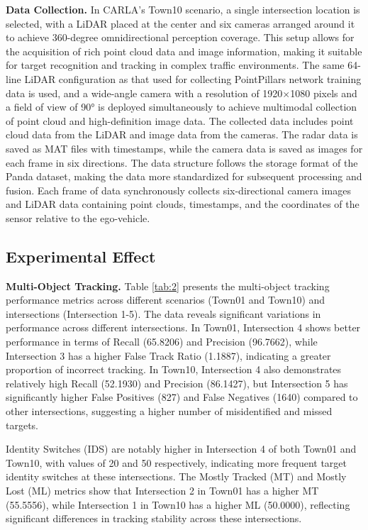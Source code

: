 \documentclass[journal,twoside,web]{ieeecolor}
\begin{document}
\textbf{Data Collection.}
In CARLA's Town10 scenario, a single intersection location is selected, with a LiDAR placed at the center and six cameras arranged around it to achieve 360-degree omnidirectional perception coverage. 
This setup allows for the acquisition of rich point cloud data and image information, making it suitable for target recognition and tracking in complex traffic environments. 
The same 64-line LiDAR configuration as that used for collecting PointPillars network training data is used, and a wide-angle camera with a resolution of 1920\(\times\)1080 pixels and a field of view of 90° is deployed simultaneously to achieve multimodal collection of point cloud and high-definition image data.
The collected data includes point cloud data from the LiDAR and image data from the cameras. 
The radar data is saved as MAT files with timestamps, while the camera data is saved as images for each frame in six directions. 
The data structure follows the storage format of the Panda dataset, making the data more standardized for subsequent processing and fusion\cite{Alpher21c}. 
Each frame of data synchronously collects six-directional camera images and LiDAR data containing point clouds, timestamps, and the coordinates of the sensor relative to the ego-vehicle.

\subsection{Experimental Effect}

\textbf{Multi-Object Tracking.}
Table \ref{tab:2} presents the multi-object tracking performance metrics across different scenarios (Town01 and Town10) and intersections (Intersection 1-5). 
The data reveals significant variations in performance across different intersections. 
In Town01, Intersection 4 shows better performance in terms of Recall (65.8206) and Precision (96.7662), while Intersection 3 has a higher False Track Ratio (1.1887), indicating a greater proportion of incorrect tracking. 
In Town10, Intersection 4 also demonstrates relatively high Recall (52.1930) and Precision (86.1427), but Intersection 5 has significantly higher False Positives (827) and False Negatives (1640) compared to other intersections, suggesting a higher number of misidentified and missed targets.

Identity Switches (IDS) are notably higher in Intersection 4 of both Town01 and Town10, with values of 20 and 50 respectively, indicating more frequent target identity switches at these intersections. 
The Mostly Tracked (MT) and Mostly Lost (ML) metrics show that Intersection 2 in Town01 has a higher MT (55.5556), while Intersection 1 in Town10 has a higher ML (50.0000), reflecting significant differences in tracking stability across these intersections.
\end{document}
